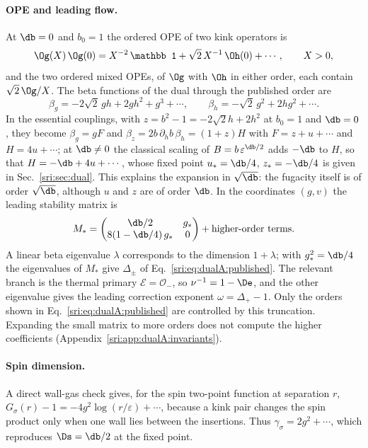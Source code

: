 \paragraph{OPE and leading flow.} At $\db=0$ and $b_0=1$ the ordered OPE of two kink operators is
\begin{equation}
 \Og(X)\,\Og(0)=X^{-2}\,\mathbb 1+\sqrt2\,X^{-1}\,\Oh(0)+\cdots,\qquad X>0,
\end{equation}
and the two ordered mixed OPEs, of $\Og$ with $\Oh$ in either order, each contain $\sqrt2\,\Og/X$. The beta
functions of the dual through the published order are
\begin{equation}
 \beta_g=-2\sqrt2\,gh+2gh^2+g^3+\cdots,\qquad \beta_h=-\sqrt2\,g^2+2hg^2+\cdots.
 \label{sri:eq:dualA:leadingbeta}
\end{equation}
In the essential couplings, with $z=b^2-1=-2\sqrt2h+2h^2$ at $b_0=1$ and $\db=0$, they become $\beta_g=gF$ and
$\beta_z=2b\,\partial_hb\,\beta_h=(1+z)H$ with $F=z+u+\cdots$ and $H=4u+\cdots$; at $\db\neq0$ the classical
scaling of $B=b\,\varepsilon^{\db/2}$ adds $-\db$ to $H$, so that $H=-\db+4u+\cdots$, whose fixed point $u_*=\db/4$,
$z_*=-\db/4$ is given in Sec.~\ref{sri:sec:dual}. This explains the expansion in $\sqrt{\db}$: the fugacity itself is of
order $\sqrt{\db}$, although $u$ and $z$ are of order $\db$. In the coordinates $(g,v)$ the leading stability matrix is
\begin{equation}
 M_*=\begin{pmatrix}\db/2&g_*\\ 8(1-\db/4)\,g_*&0\end{pmatrix}+\text{higher-order terms}.
 \label{sri:eq:dualA:Mstar}
\end{equation}
A linear beta eigenvalue $\lambda$ corresponds to the dimension $1+\lambda$; with $g_*^2=\db/4$ the eigenvalues of
$M_*$ give $\Delta_\pm$ of Eq.~\eqref{sri:eq:dualA:published}. The relevant branch is the thermal primary
$\mathcal E=\mathcal O_-$, so $\nu^{-1}=1-\De$, and the other eigenvalue gives the leading correction exponent
$\omega=\Delta_+-1$. Only the orders shown in Eq.~\eqref{sri:eq:dualA:published} are controlled by this truncation.
Expanding the small matrix to more orders does not compute the higher coefficients
(Appendix~\ref{sri:app:dualA:invariants}).

\paragraph{Spin dimension.} A direct wall-gas check gives, for the spin two-point function at separation $r$,
$G_\sigma(r)-1=-4g^2\log(r/\varepsilon)+\cdots$, because a kink pair changes the spin product only when one wall lies
between the insertions. Thus $\gamma_\sigma=2g^2+\cdots$, which reproduces $\Ds=\db/2$ at the fixed point.

